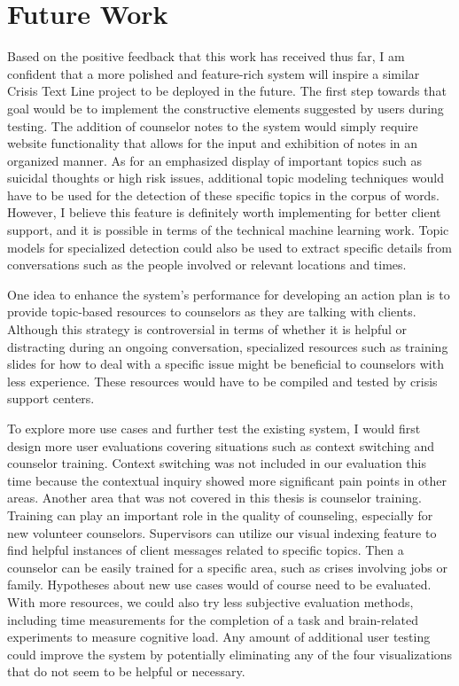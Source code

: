\chapter{Future Work}

Based on the positive feedback that this work has received thus far, I am confident that a more polished and feature-rich system will inspire a similar Crisis Text Line project to be deployed in the future. The first step towards that goal would be to implement the constructive elements suggested by users during testing. The addition of counselor notes to the system would simply require website functionality that allows for the input and exhibition of notes in an organized manner. As for an emphasized display of important topics such as suicidal thoughts or high risk issues, additional topic modeling techniques would have to be used for the detection of these specific topics in the corpus of words. However, I believe this feature is definitely worth implementing for better client support, and it is possible in terms of the technical machine learning work. Topic models for specialized detection could also be used to extract specific details from conversations such as the people involved or relevant locations and times.

One idea to enhance the system's performance for developing an action plan is to provide topic-based resources to counselors as they are talking with clients. Although this strategy is controversial in terms of whether it is helpful or distracting during an ongoing conversation, specialized resources such as training slides for how to deal with a specific issue might be beneficial to counselors with less experience. These resources would have to be compiled and tested by crisis support centers.

To explore more use cases and further test the existing system, I would first design more user evaluations covering situations such as context switching and counselor training. Context switching was not included in our evaluation this time because the contextual inquiry showed more significant pain points in other areas. Another area that was not covered in this thesis is counselor training. Training can play an important role in the quality of counseling, especially for new volunteer counselors. Supervisors can utilize our visual indexing feature to find helpful instances of client messages related to specific topics. Then a counselor can be easily trained for a specific area, such as crises involving jobs or family. Hypotheses about new use cases would of course need to be evaluated. With more resources, we could also try less subjective evaluation methods, including time measurements for the completion of a task and brain-related experiments to measure cognitive load. Any amount of additional user testing could improve the system by potentially eliminating any of the four visualizations that do not seem to be helpful or necessary.

